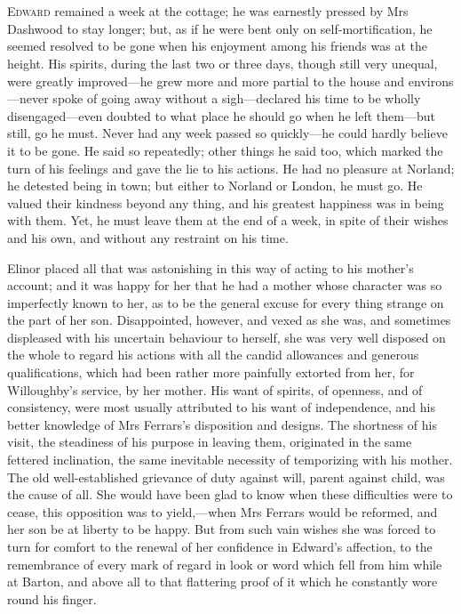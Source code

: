 \chapter[Chapter \thechapter]{}
\lettrine[lraise=0.3]{E}{dward} remained a week at the cottage; he was earnestly pressed by Mrs Dashwood to stay longer; but, as if he were bent only on self-mortification, he seemed resolved to be gone when his enjoyment among his friends was at the height. His spirits, during the last two or three days, though still very unequal, were greatly improved—he grew more and more partial to the house and environs—never spoke of going away without a sigh—declared his time to be wholly disengaged—even doubted to what place he should go when he left them—but still, go he must. Never had any week passed so quickly—he could hardly believe it to be gone. He said so repeatedly; other things he said too, which marked the turn of his feelings and gave the lie to his actions. He had no pleasure at Norland; he detested being in town; but either to Norland or London, he must go. He valued their kindness beyond any thing, and his greatest happiness was in being with them. Yet, he must leave them at the end of a week, in spite of their wishes and his own, and without any restraint on his time.

Elinor placed all that was astonishing in this way of acting to his mother's account; and it was happy for her that he had a mother whose character was so imperfectly known to her, as to be the general excuse for every thing strange on the part of her son. Disappointed, however, and vexed as she was, and sometimes displeased with his uncertain behaviour to herself, she was very well disposed on the whole to regard his actions with all the candid allowances and generous qualifications, which had been rather more painfully extorted from her, for Willoughby's service, by her mother. His want of spirits, of openness, and of consistency, were most usually attributed to his want of independence, and his better knowledge of Mrs Ferrars's disposition and designs. The shortness of his visit, the steadiness of his purpose in leaving them, originated in the same fettered inclination, the same inevitable necessity of temporizing with his mother. The old well-established grievance of duty against will, parent against child, was the cause of all. She would have been glad to know when these difficulties were to cease, this opposition was to yield,—when Mrs Ferrars would be reformed, and her son be at liberty to be happy. But from such vain wishes she was forced to turn for comfort to the renewal of her confidence in Edward's affection, to the remembrance of every mark of regard in look or word which fell from him while at Barton, and above all to that flattering proof of it which he constantly wore round his finger.

